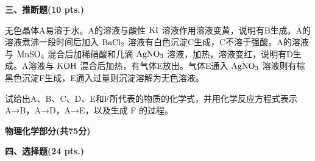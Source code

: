 \vspace{0.5cm}
\noindent\textbf{三、推断题(10 pts.)}

无色晶体A易溶于水。A的溶液与酸性 $\ce{KI}$ 溶液作用溶液变黄，说明有B生成。A的溶液煮沸一段时间后加入 $\ce{BaCl2}$ 溶液有白色沉淀C生成，C不溶于强酸。A的溶液与 $\ce{MnSO4}$ 混合后加稀硝酸和几滴 $\ce{AgNO3}$ 溶液，加热，溶液变红，说明有D生成。A溶液与 $\ce{KOH}$ 混合后加热，有气体E放出。气体E通入 $\ce{AgNO3}$ 溶液则有棕黑色沉淀F生成，E通入过量则沉淀溶解为无色溶液。

试给出A、B、C、D、E和F所代表的物质的化学式，并用化学反应方程式表示 A→B，A→D，A→E，以及生成 F 的过程。

\vspace{1cm}
\begin{center}
    {\Large \textbf{物理化学部分(共75分)}}
\end{center}

\vspace{0.5cm}
\noindent\textbf{四、选择题(24 pts.)}

